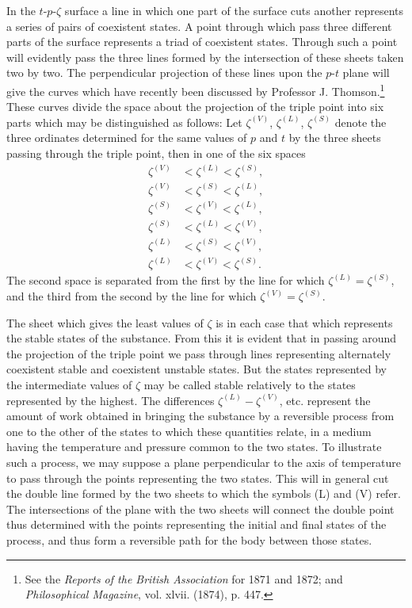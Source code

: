 \documentclass[11pt]{article}
\begin{document}
In the $t$-$p$-$\zeta$ surface a line in which one part of the surface cuts another represents a series of pairs of coexistent states. A point through which pass three different parts of the surface represents a triad of coexistent states. Through such a point will evidently pass the three lines formed by the intersection of these sheets taken two by two. The perpendicular projection of these lines upon the $p$-$t$ plane will give the curves which have recently been discussed by Professor J. Thomson.\footnote{See the \textit{Reports of the British Association} for 1871 and 1872; and \textit{Philosophical Magazine}, vol. xlvii. (1874), p. 447.} These curves divide the space about the projection of the triple point into six parts which may be distinguished as follows: Let $\zeta^{(V)}$, $\zeta^{(L)}$, $\zeta^{(S)}$ denote the three ordinates determined for the same values of $p$ and $t$ by the three sheets passing through the triple point, then in one of the six spaces
\begin{align}
\zeta^{(V)}&<\zeta^{(L)}<\zeta^{(S)}, \tag{191}\label{eq:gibbs-v1-p3-191}\\
\zeta^{(V)}&<\zeta^{(S)}<\zeta^{(L)}, \tag{192}\label{eq:gibbs-v1-p3-192}\\
\zeta^{(S)}&<\zeta^{(V)}<\zeta^{(L)}, \tag{193}\label{eq:gibbs-v1-p3-193}\\
\zeta^{(S)}&<\zeta^{(L)}<\zeta^{(V)}, \tag{194}\label{eq:gibbs-v1-p3-194}\\
\zeta^{(L)}&<\zeta^{(S)}<\zeta^{(V)}, \tag{195}\label{eq:gibbs-v1-p3-195}\\
\zeta^{(L)}&<\zeta^{(V)}<\zeta^{(S)}. \tag{196}\label{eq:gibbs-v1-p3-196}
\end{align}
The second space is separated from the first by the line for which $\zeta^{(L)}=\zeta^{(S)}$, and the third from the second by the line for which $\zeta^{(V)}=\zeta^{(S)}$.

The sheet which gives the least values of $\zeta$ is in each case that which represents the stable states of the substance. From this it is evident that in passing around the projection of the triple point we pass through lines representing alternately coexistent stable and coexistent unstable states. But the states represented by the intermediate values of $\zeta$ may be called stable relatively to the states represented by the highest. The differences $\zeta^{(L)}-\zeta^{(V)}$, etc. represent the amount of work obtained in bringing the substance by a reversible process from one to the other of the states to which these quantities relate, in a medium having the temperature and pressure common to the two states. To illustrate such a process, we may suppose a plane perpendicular to the axis of temperature to pass through the points representing the two states. This will in general cut the double line formed by the two sheets to which the symbols (L) and (V) refer. The intersections of the plane with the two sheets will connect the double point thus determined with the points representing the initial and final states of the process, and thus form a reversible path for the body between those states.
\end{document}
